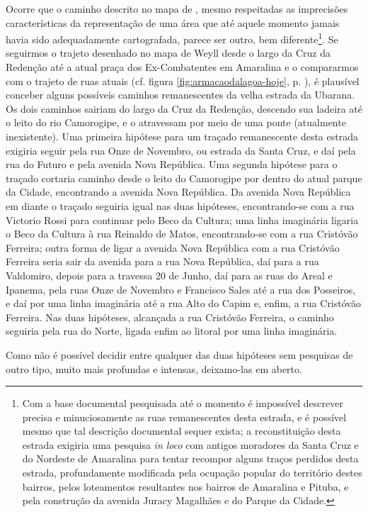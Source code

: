 Ocorre que o caminho descrito no mapa de , mesmo respeitadas as imprecisões características da representação de uma área que até aquele momento jamais havia sido adequadamente cartografada, parece ser outro, bem diferente\footnote{Com a base documental pesquisada até o momento é impossível descrever precisa e minuciosamente as ruas remanescentes desta estrada, e é possível mesmo que tal descrição documental sequer exista; a reconstituição desta estrada exigiria uma pesquisa \textit{in loco} com antigos moradores da Santa Cruz e do Nordeste de Amaralina para tentar recompor alguns traços perdidos desta estrada, profundamente modificada pela ocupação popular do território destes bairros, pelos loteamentos resultantes nos bairros de Amaralina e Pituba, e pela construção da avenida Juracy Magalhães e do Parque da Cidade.}. Se seguirmos o trajeto desenhado no mapa de Weyll desde o largo da Cruz da Redenção até a atual praça dos Ex-Combatentes em Amaralina e o compararmos com o trajeto de ruas atuais (cf. figura \autoref{fig:armacaodalagoa-hoje}, p. \pageref{fig:armacaodalagoa-hoje}), é plausível conceber alguns possíveis caminhos remanescentes da velha estrada da Ubarana. Os dois caminhos sairiam do largo da Cruz da Redenção, descendo sua ladeira até o leito do rio Camorogipe, e o atravessam por meio de uma ponte (atualmente inexistente). Uma primeira hipótese para um traçado remanescente desta estrada exigiria seguir pela rua Onze de Novembro, ou estrada da Santa Cruz, e daí pela rua do Futuro e pela avenida Nova República. Uma segunda hipótese para o traçado cortaria caminho desde o leito do Camorogipe por dentro do atual parque da Cidade, encontrando a avenida Nova República. Da avenida Nova República em diante o traçado seguiria igual nas duas hipóteses, encontrando-se com a rua Victorio Rossi para continuar pelo Beco da Cultura; uma linha imaginária ligaria o Beco da Cultura à rua Reinaldo de Matos, encontrando-se com a rua Cristóvão Ferreira; outra forma de ligar a avenida Nova República com a rua Cristóvão Ferreira seria sair da avenida para a rua Nova República, daí para a rua Valdomiro, depois para a travessa 20 de Junho, daí para as ruas do Areal e Ipanema, pela ruas Onze de Novembro e Francisco Sales até a rua dos Posseiros, e daí por uma linha imaginária até a rua Alto do Capim e, enfim, a rua Cristóvão Ferreira. Nas duas hipóteses, alcançada a rua Cristóvão Ferreira, o caminho seguiria pela rua do Norte, ligada enfim ao litoral por uma linha imaginária. 

Como não é possível decidir entre qualquer das duas hipóteses sem pesquisas de outro tipo, muito mais profundas e intensas, deixamo-las em aberto.


